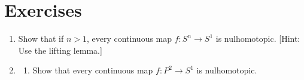 \section*{Exercises}
\begin{enumerate}[itemsep=0.4em, parsep=0pt, topsep=0pt, partopsep=0pt, leftmargin=*, label=\arabic*., ref=\arabic*]
\item Show that if \(n > 1\), every continuous map \(f : S^{n} \rightarrow {S}^{1}\) is nulhomotopic. [Hint: Use the lifting lemma.]
\item
 \begin{enumerate}[itemsep=0.2em, parsep=0pt, topsep=0pt, partopsep=0pt, leftmargin=*, label=(\alph*), align=left]
 \item Show that every continuous map \(f : P^{2} \rightarrow {S}^{1}\) is nulhomotopic.


\end{enumerate}
\end{enumerate}
